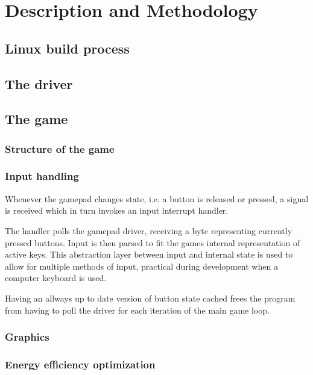 \section{Description and Methodology}

\subsection{Linux build process}

\subsection{The driver}

\subsection{The game}

\subsubsection{Structure of the game}

\subsubsection{Input handling}

Whenever the gamepad changes state, i.e. a button is released or pressed,
a signal is received which in turn invokes an input interrupt handler.

The handler polls the gamepad driver, receiving a byte representing currently
pressed buttons. Input is then parsed to fit the games internal representation
of active keys. This abstraction layer between input and internal state is used
to allow for multiple methods of input, practical during development when a
computer keyboard is used.

Having an allways up to date version of button state cached frees the program
from having to poll the driver for each iteration of the main game loop.

\subsubsection{Graphics}

\subsubsection{Energy efficiency optimization}
